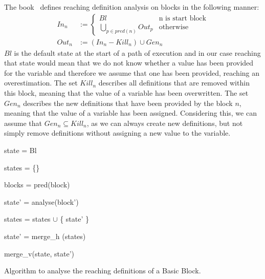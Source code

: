 The book~\cite{khedker2009data} defines reaching definition analysis on blocks in the following manner:
\begin{subequations}
\label{eq:reachingbasedef}
\begin{align}
In_n &:= \left\{
  \begin{array}{lr}
    Bl & \text{n is start block}\\
    \underset{p \in pred(n)}{\bigcup} Out_p & \text{otherwise}
  \end{array}
\right. \label{eq:reachingbasedefInt}\\
Out_n &:= (In_n - Kill_n) \cup Gen_n \label{eq:reachingbasedefOut}
\end{align}
\end{subequations}
$Bl$ is the default state at the start of a path of execution and in our case reaching that state would mean that we do not 
know whether a value has been provided for the variable and therefore we assume that one has been provided, reaching an 
overestimation. The set $Kill_n$ describes all definitions that are removed within this block, meaning that the value of 
a variable has been overwritten. The set $Gen_n$ describes the new definitions that have been provided by the block $n$, 
meaning that the value of a variable has been assigned. Considering this, we can assume that $Gen_n \subseteq Kill_n$, 
as we can always create new definitions, but not simply remove definitions without assigning a new value to the variable.

  \begin{algorithm}[!h]
	\SetAlgoLined
	{
 	state = Bl
 	

	states = \{\}
	
	blocks = pred(block)
	
	 {
	
 		state' = analyse(block')
 		
		states = states $\cup$ \{ state' \}
	}

	state' = merge\_h (states)

	\Return merge\_v(state, state')

	}
\caption{Algorithm to analyse the reaching definitions of a Basic Block.}
\label{alg:reaching}
\end{algorithm}

